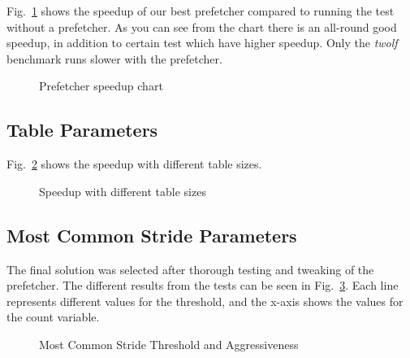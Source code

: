 Fig.~\ref{fig:prefetcher_speedup} shows the speedup of our best prefetcher
compared to running the test without a prefetcher. As you can see from the
chart there is an all-round good speedup, in addition to certain test which
have higher speedup. Only the \emph{twolf} benchmark runs slower with the
prefetcher.

\begin{figure}
	
	\caption{Prefetcher speedup chart}
	\label{fig:prefetcher_speedup}
\end{figure}

\subsection{Table Parameters}
Fig.~\ref{fig:table_size_chart} shows the speedup with different table sizes.

\begin{figure}
	
	\caption{Speedup with different table sizes}
	\label{fig:table_size_chart}
\end{figure}

\subsection{Most Common Stride Parameters}

The final solution was selected after thorough testing and tweaking of the
prefetcher. The different results from the tests can be seen in
Fig.~\ref{fig:prefetcher_tweaks}. Each line represents different values for the
threshold, and the x-axis shows the values for the count variable.

\begin{figure}
	
	\caption{Most Common Stride Threshold and Aggressiveness}
	\label{fig:prefetcher_tweaks}
\end{figure}
